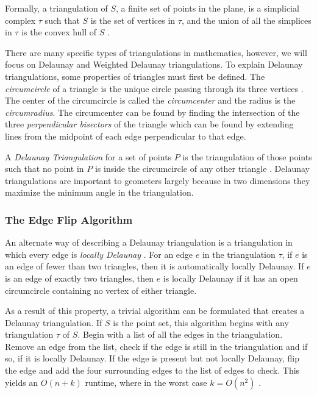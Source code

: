 \documentclass[11pt]{article}
\begin{document}
Formally, a triangulation of $S$, a finite set of points in the plane, is a simplicial complex $\tau$ such that $S$ is the set of vertices in $\tau$, and the union of all the simplices in $\tau$ is the convex hull of $S$ \cite{meshGeneration}.

There are many specific types of triangulations in mathematics, however, we will focus on Delaunay and Weighted Delaunay triangulations. To explain Delaunay triangulations, some properties of triangles must first be defined. The \emph{circumcircle} of a triangle is the unique circle passing through its three vertices \cite{mathworld:Circumcenter}. The center of the circumcircle is called the \emph{circumcenter} and the radius is the \emph{circumradius}. The circumcenter can be found by finding the intersection of the three \emph{perpendicular bisectors} of the triangle which can be found by extending lines from the midpoint of each edge perpendicular to that edge.
  
A \emph{Delaunay Triangulation} for a set of points $P$ is the triangulation of those points such that no point in $P$ is inside the circumcircle of any other triangle \cite{meshGeneration}. Delaunay triangulations are important to geometers largely because in two dimensions they maximize the minimum angle in the triangulation.

\subsubsection{The Edge Flip Algorithm}
An alternate way of describing a Delaunay triangulation is a triangulation in which every edge is \emph{locally Delaunay} \cite{meshGeneration}. For an edge $e$ in the triangulation $\tau$, if $e$ is an edge of fewer than two triangles, then it is automatically locally Delaunay. If $e$ is an edge of exactly two triangles, then $e$ is locally Delaunay if it has an open circumcircle containing no vertex of either triangle. 

As a result of this property, a trivial algorithm can be formulated that creates a Delaunay triangulation. If $S$ is the point set, this algorithm begins with any triangulation $\tau$ of $S$. Begin with a list of all the edges in the triangulation. Remove an edge from the list, check if the edge is still in the triangulation and if so, if it is locally Delaunay. If the edge is present but not locally Delaunay, flip the edge and add the four surrounding edges to the list of edges to check. This yields an $O(n + k)$ runtime, where in the worst case $k = O(n^2)$ \cite{meshGeneration}.
\end{document}
